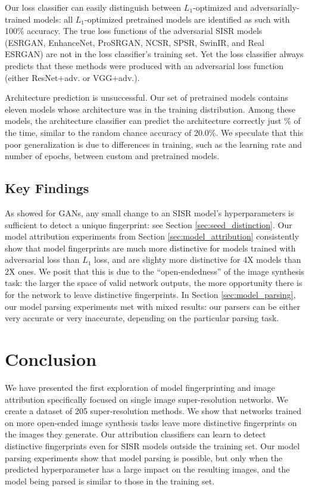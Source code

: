 \documentclass[10pt]{article} %
\begin{document}
Our loss classifier can easily distinguish between $L_1$-optimized and adversarially-trained models: all $L_1$-optimized pretrained models are identified as such with 100\% accuracy. The true loss functions of the adversarial SISR models (ESRGAN, EnhanceNet, ProSRGAN, NCSR, SPSR, SwinIR, and Real ESRGAN) are not in the loss classifier's training set. Yet the loss classifier always predicts that these methods were produced with an adversarial loss function (either ResNet+adv. or VGG+adv.).

Architecture prediction is unsuccessful. Our set of pretrained models contains eleven models whose architecture was in the training distribution. Among these models, the architecture classifier can predict the architecture correctly just \valPretrainedArchParsingAccuracyMean\% of the time, similar to the random chance accuracy of 20.0\%. We speculate that this poor generalization is due to differences in training, such as the learning rate and number of epochs, between custom and pretrained models.

\subsection{Key Findings}

As \cite{yu2019attributing} showed for GANs, any small change to an SISR model's hyperparameters is sufficient to detect a unique fingerprint: see Section \ref{sec:seed_distinction}. Our model attribution experiments from Section \ref{sec:model_attribution} consistently show that model fingerprints are much more distinctive for models trained with adversarial loss than $L_1$ loss, and are slighty more distinctive for 4X models than 2X ones. We posit that this is due to the ``open-endedness'' of the image synthesis task: the larger the space of valid network outputs, the more opportunity there is for the network to leave distinctive fingerprints. In Section \ref{sec:model_parsing}, our model parsing experiments met with mixed results: our parsers can be either very accurate or very inaccurate, depending on the particular parsing task.

\section{Conclusion}
We have presented the first exploration of model fingerprinting and image attribution specifically focused on single image super-resolution networks. We create a dataset of 205 super-resolution methods. We show that networks trained on more open-ended image synthesis tasks leave more distinctive fingerprints on the images they generate. Our attribution classifiers can learn to detect distinctive fingerprints even for SISR models outside the training set. Our model parsing experiments show that model parsing is possible, but only when the predicted hyperparameter has a large impact on the resulting images, and the model being parsed is similar to those in the training set.
\end{document}
